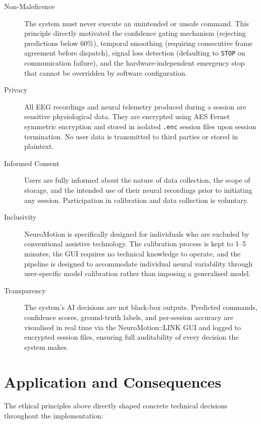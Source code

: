 \documentclass[12pt, a4paper, oneside]{report}
\begin{document}
\begin{description}
\begin{description}
    \item[Non-Maleficence]
    The system must never execute an unintended or unsafe command. This principle
    directly motivated the confidence gating mechanism (rejecting predictions below
    60\%), temporal smoothing (requiring consecutive frame agreement before dispatch),
    signal loss detection (defaulting to \texttt{STOP} on communication failure), and
    the hardware-independent emergency stop that cannot be overridden by software
    configuration.

    \item[Privacy]
    All EEG recordings and neural telemetry produced during a session are sensitive
    physiological data. They are encrypted using AES Fernet symmetric encryption and
    stored in isolated \texttt{.enc} session files upon session termination. No user
    data is transmitted to third parties or stored in plaintext.

    \item[Informed Consent]
    Users are fully informed about the nature of data collection, the scope of storage,
    and the intended use of their neural recordings prior to initiating any session.
    Participation in calibration and data collection is voluntary.

    \item[Inclusivity]
    NeuroMotion is specifically designed for individuals who are excluded by
    conventional assistive technology. The calibration process is kept to 1--5 minutes,
    the GUI requires no technical knowledge to operate, and the pipeline is designed
    to accommodate individual neural variability through user-specific model
    calibration rather than imposing a generalised model.

    \item[Transparency]
    The system's AI decisions are not black-box outputs. Predicted commands,
    confidence scores, ground-truth labels, and per-session accuracy are visualised
    in real time via the NeuroMotion::LINK GUI and logged to encrypted session files,
    ensuring full auditability of every decision the system makes.
\end{description}

\section{Application and Consequences}

The ethical principles above directly shaped concrete technical decisions throughout
the implementation:


\end{description}
\end{document}
